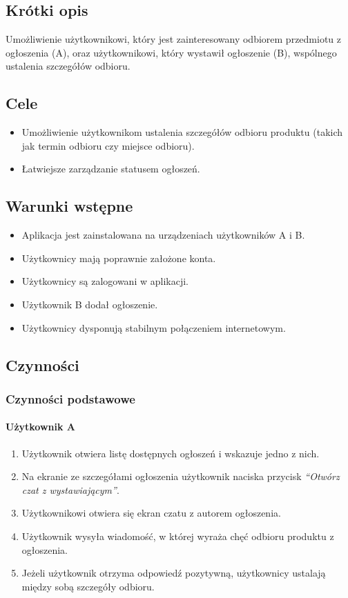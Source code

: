 \documentclass[licencjacka]{pracamgr}
\begin{document}
    \subsection{Krótki opis}
    Umożliwienie użytkownikowi, który jest zainteresowany odbiorem przedmiotu z ogłoszenia (A), oraz użytkownikowi, który wystawił ogłoszenie (B), wspólnego ustalenia szczegółów odbioru.
    \subsection{Cele}
    \begin{itemize}
        \item Umożliwienie użytkownikom ustalenia szczegółów odbioru produktu (takich jak termin odbioru czy miejsce odbioru).
        \item Łatwiejsze zarządzanie statusem ogłoszeń.
    \end{itemize}
    \subsection{Warunki wstępne}
    \begin{itemize}
        \item Aplikacja jest zainstalowana na urządzeniach użytkowników A i B.
        \item Użytkownicy mają poprawnie założone konta.
        \item Użytkownicy są zalogowani w aplikacji.
        \item Użytkownik B dodał ogłoszenie.
        \item Użytkownicy dysponują stabilnym połączeniem internetowym.
    \end{itemize}
    \subsection{Czynności}
    \subsubsection{Czynności podstawowe}
    \paragraph{Użytkownik A}
    \begin{enumerate}
        \item Użytkownik otwiera listę dostępnych ogłoszeń i wskazuje jedno z nich.
        \item Na ekranie ze szczegółami ogłoszenia użytkownik naciska przycisk \textit{``Otwórz czat z wystawiającym''}.
        \item Użytkownikowi otwiera się ekran czatu z autorem ogłoszenia.
        \item Użytkownik wysyła wiadomość, w której wyraża chęć odbioru produktu z ogłoszenia.
        \item Jeżeli użytkownik otrzyma odpowiedź pozytywną, użytkownicy ustalają między sobą szczegóły odbioru.
    \end{enumerate}
\end{document}
